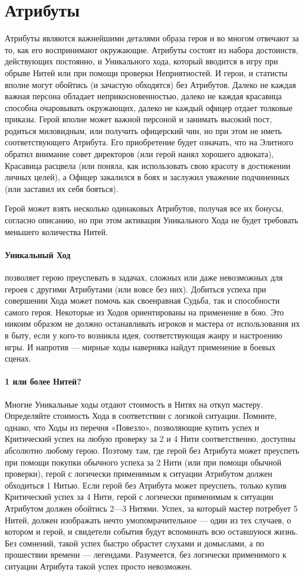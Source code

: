 \section{Атрибуты}
Атрибуты являются важнейшими деталями образа героя и во многом отвечают за то, как его воспринимают окружающие. Атрибуты состоят из набора достоинств, действующих постоянно, и Уникального хода, который вводится в игру при обрыве Нитей или при помощи проверки Неприятностей.
И герои, и статисты вполне могут обойтись (и зачастую обходятся) без Атрибутов. Далеко не каждая важная персона обладает неприкосновенностью, далеко не каждая красавица способна очаровывать окружающих, далеко не каждый офицер отдает толковые приказы. Герой вполне может важной персоной и занимать высокий пост, родиться миловидным, или получить офицерский чин, но при этом не иметь соответствующего Атрибута. Его приобретение будет означать, что на Элитного обратил внимание совет директоров (или герой нанял хорошего адвоката), Красавица расцвела (или поняла, как использовать свою красоту в достижении личных целей), а Офицер закалился в боях и заслужил уважение подчиненных (или заставил их себя бояться).
\begin{tcolorbox}
Герой может взять несколько одинаковых Атрибутов, получая все их бонусы, согласно описанию, но при этом активация Уникального Хода не будет требовать меньшего количества Нитей.
\end{tcolorbox}
\paragraph{Уникальный Ход} позволяет герою преуспевать в задачах, сложных или даже невозможных для героев с другими Атрибутами (или вовсе без них). Добиться успеха при совершении Хода может помочь как своенравная Судьба, так и способности самого героя. Некоторые из Ходов ориентированы на применение в бою. Это никоим образом не должно останавливать игроков и мастера от использования их в быту, если у кого-то возникла идея, соответствующая жанру и настроению игры. И напротив — мирные ходы наверняка найдут применение в боевых сценах.
\paragraph{1 или более Нитей?} Многие Уникальные ходы отдают стоимость в Нитях на откуп мастеру. Определяйте стоимость Хода в соответствии с логикой ситуации. Помните, однако, что Ходы из перечня «Повезло», позволяющие купить успех и Критический успех на любую проверку за 2 и 4 Нити соответственно, доступны абсолютно любому герою. Поэтому там, где герой без Атрибута может преуспеть при помощи покупки обычного успеха за 2 Нити (или при помощи обычной проверки), герой с логически применимым к ситуации Атрибутом должен обходиться 1 Нитью. Если герой без Атрибута может преуспеть, только купив Критический успех за 4 Нити, герой с логически применимым к ситуации Атрибутом должен обойтись 2—3 Нитями. Успех, за который мастер потребует 5 Нитей, должен изображать нечто умопомрачительное — один из тех случаев, о котором и герой, и свидетели события будут вспоминать всю оставшуюся жизнь. Без сомнений, такой успех быстро обрастет слухами и домыслами, а по прошествии времени — легендами. Разумеется, без логически применимого к ситуации Атрибута такой успех просто невозможен.
